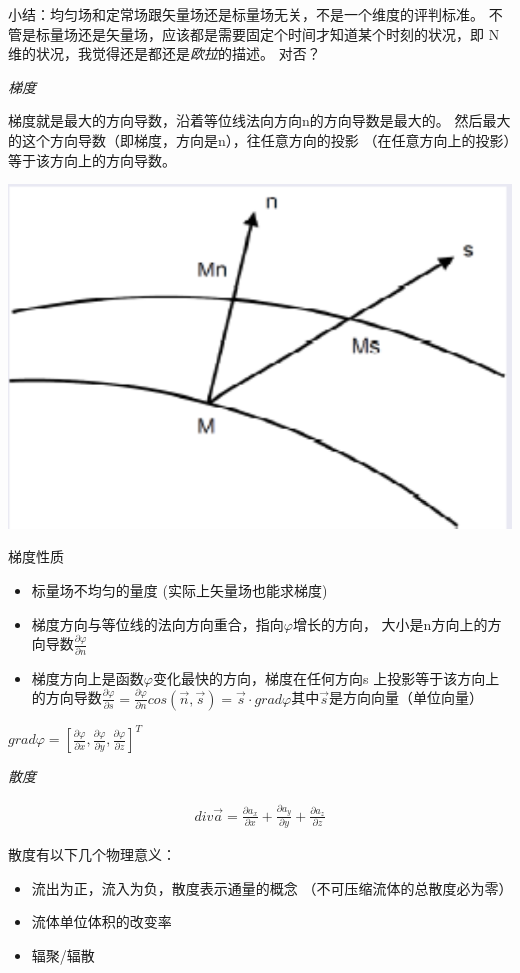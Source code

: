 \documentclass[UTF8,12pt]{article}
\begin{document}
小结：均匀场和定常场跟矢量场还是标量场无关，不是一个维度的评判标准。
不管是标量场还是矢量场，应该都是需要固定个时间才知道某个时刻的状况，即
N维的状况，我觉得还是都还是\emph{欧拉}的描述。{\color{red} 对否？}

\emph{梯度}

梯度就是最大的方向导数，沿着等位线法向方向n的方向导数是最大的。
然后最大的这个方向导数（即梯度，方向是n），往任意方向的投影
（在任意方向上的投影）等于该方向上的方向导数。

\begin{center}
    \includegraphics[width=0.5\linewidth]{img/tidu.png}
\end{center}

梯度性质
\begin{itemize}
    \item 标量场不均匀的量度 (实际上矢量场也能求梯度)
    \item 梯度方向与等位线的法向方向重合，指向$\varphi$增长的方向，
    大小是n方向上的方向导数$\frac{\partial \varphi}{\partial n}$
    \item 梯度方向上是函数$\varphi$变化最快的方向，梯度在任何方向s
    上投影等于该方向上的方向导数$\frac{\partial \varphi}{\partial s} = \frac{\partial \varphi}{\partial n}cos(\vec n,\vec s) = \vec s \cdot grad \varphi$其中$\vec s$是方向向量（单位向量）
\end{itemize}

$grad \varphi = [\frac{\partial \varphi}{\partial x},\frac{\partial \varphi}{\partial y},\frac{\partial \varphi}{\partial z}]^{T}$

\emph{散度}

\begin{align*}
    div \vec a = \frac{\partial a_x}{\partial x} 
                + \frac{\partial a_y}{\partial y} 
                + \frac{\partial a_z}{\partial z}
\end{align*}

\newpage
散度有以下几个物理意义：

\begin{itemize}
    \item 流出为正，流入为负，散度表示通量的概念
    （不可压缩流体的总散度必为零）
    \item 流体单位体积的改变率
    \item 辐聚/辐散
\end{itemize}
\end{document}
